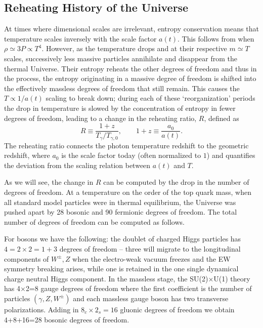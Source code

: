 
\subsection{Reheating History of the Universe}\label{Eralink}

At times where dimensional scales are irrelevant, entropy conservation means that temperature scales inversely with the scale factor $a(t)$. This follows from  when $ \rho\simeq 3P \propto T^4$. However, as the temperature drops and at their respective $m\simeq T$ scales, successively less massive particles annihilate and disappear from the thermal Universe. Their entropy reheats the other degrees of freedom and thus in the process, the entropy originating in a massive degree of freedom is shifted into the effectively massless degrees of freedom that still remain. This causes the $T\propto 1/a(t)$ scaling to break down; during each of these `reorganization' periods the drop in temperature is slowed by the concentration of entropy in fewer degrees of freedom, leading to a change in the reheating ratio, $R$, defined as
\begin{equation}\label{redshiftratio}
R\equiv \frac{1+z}{ T_\gamma/T_{\gamma,0}}, \qquad 1+z\equiv \frac{a_{0}}{a(t)}.
\end{equation}
The reheating ratio connects the photon temperature redshift to the geometric redshift, where $a_0$ is the scale factor today (often normalized to $1$) and quantifies the deviation from the scaling relation between $a(t)$ and $T$.

As we will see, the change in $R$ can be computed by the drop in the number of degrees of freedom. At a temperature on the order of the top quark mass, when all standard model particles were in thermal equilibrium, the Universe was pushed apart by 28 bosonic and 90 fermionic degrees of freedom. The total number of degrees of freedom can be computed as follows. 

For bosons we have the following: the doublet of charged Higgs particles has $4=2\times2=1+3$ degrees of freedom -- three will migrate to the longitudinal components of $W^\pm, Z$ when the electro-weak vacuum freezes and the EW symmetry breaking arises, while one is retained in the one single dynamical charge neutral Higgs component. In the massless stage, the SU(2)$\times$U(1) theory has 4$\times$2=8 gauge degrees of freedom where the first coefficient is the number of particles $(\gamma, Z, W^\pm)$ and each massless gauge boson has two transverse polarizations. Adding in $8_c\times2_s=16$ gluonic degrees of freedom we obtain 4+8+16=28 bosonic degrees of freedom. 

